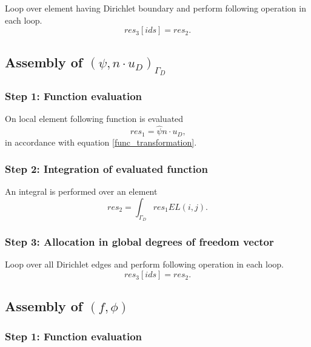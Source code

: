 \documentclass[a4paper,twoside,openright]{book}
\begin{document}
Loop over element having Dirichlet boundary and perform following operation in each loop. 
\begin{equation}
res_3[ids]=res_2 \textrm{.}
\end{equation}

\subsection{Assembly of $(\psi, n \cdot u_D)_{\Gamma_D} $}

\subsubsection{Step 1: Function evaluation}

On local element following function is evaluated 
\begin{equation}
res_1 = \hat{\psi} n\cdot u_D \textrm{,}
\end{equation} 
in accordance with equation \eqref{func_transformation}.\\

\subsubsection{Step 2: Integration of evaluated function}

An integral is performed over an element 
\begin{equation}
res_2 = \int_{\Gamma_D} res_1 EL(i,j) \textrm{.}
\end{equation}

\subsubsection{Step 3: Allocation in global degrees of freedom vector}

Loop over all Dirichlet edges and perform following operation in each loop.
\begin{equation}
res_3[ids]=res_2 \textrm{.}
\end{equation}

\subsection{Assembly of $(f,\phi) $}

\subsubsection{Step 1: Function evaluation}
\end{document}
